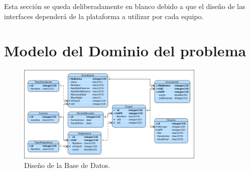 \documentclass[oneside,10pt]{book}
\begin{document}
{\color{UCInterfaceColor} 
	Esta sección se queda deliberadamente en blanco debido a que el diseño de las interfaces dependerá de la plataforma a utilizar por cada equipo.\\	
}



\chapter{Modelo del Dominio del problema}

	\begin{figure}[htbp!]
		\centering
			\includegraphics[width=0.8\textwidth]{images/baseDeDatos}
		\caption{Diseño de la Base de Datos.}
	\end{figure}
	
\end{document}
